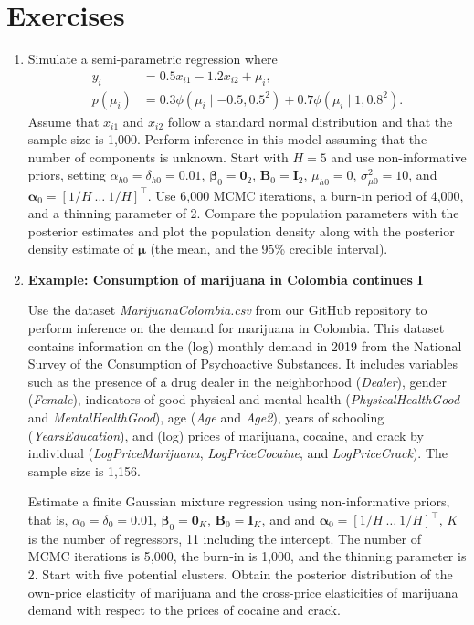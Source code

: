 \section{Exercises}\label{sec11_4}

\begin{enumerate}
	\item Simulate a semi-parametric regression where  
	\begin{align*}
		y_i &= 0.5x_{i1} - 1.2x_{i2} + \mu_i, \\
		p(\mu_i) &= 
		0.3 \phi(\mu_i \mid -0.5,0.5^2) + 0.7 \phi(\mu_i \mid 1,0.8^2).		
	\end{align*}
	Assume that $x_{i1}$ and $x_{i2}$ follow a standard normal distribution and that the sample size is 1,000. Perform inference in this model assuming that the number of components is unknown. Start with $H=5$ and use non-informative priors, setting $\alpha_{h0}=\delta_{h0}=0.01$, $\boldsymbol{\beta}_0=\boldsymbol{0}_2$, $\boldsymbol{B}_0=\boldsymbol{I}_2$, $\mu_{h0}=0$, $\sigma^2_{\mu 0}=10$, and $\boldsymbol{\alpha}_0=[1/H \ \dots \ 1/H]^{\top}$. Use 6,000 MCMC iterations, a burn-in period of 4,000, and a thinning parameter of 2. Compare the population parameters with the posterior estimates and plot the population density along with the posterior density estimate of $\boldsymbol{\mu}$ (the mean, and the 95\% credible interval).
	
	\item \textbf{Example: Consumption of marijuana in Colombia continues I}
	
	Use the dataset \textit{MarijuanaColombia.csv} from our GitHub repository to perform inference on the demand for marijuana in Colombia. This dataset contains information on the (log) monthly demand in 2019 from the National Survey of the Consumption of Psychoactive Substances. It includes variables such as the presence of a drug dealer in the neighborhood (\textit{Dealer}), gender (\textit{Female}), indicators of good physical and mental health (\textit{PhysicalHealthGood} and \textit{MentalHealthGood}), age (\textit{Age} and \textit{Age2}), years of schooling (\textit{YearsEducation}), and (log) prices of marijuana, cocaine, and crack by individual (\textit{LogPriceMarijuana}, \textit{LogPriceCocaine}, and \textit{LogPriceCrack}). The sample size is 1,156.
	
	Estimate a finite Gaussian mixture regression using non-informative priors, that is, $\alpha_{0}=\delta_{0}=0.01$, $\boldsymbol{\beta}_{0}=\boldsymbol{0}_K$, $\boldsymbol{B}_{0}=\boldsymbol{I}_K$, and and $\boldsymbol{\alpha}_0=[1/H \ \dots \ 1/H]^{\top}$, $K$ is the number of regressors, 11 including the intercept. The number of MCMC iterations is 5,000, the burn-in is 1,000, and the thinning parameter is 2. Start with five potential clusters. Obtain the posterior distribution of the own-price elasticity of marijuana and the cross-price elasticities of marijuana demand with respect to the prices of cocaine and crack.
	

\end{enumerate}
